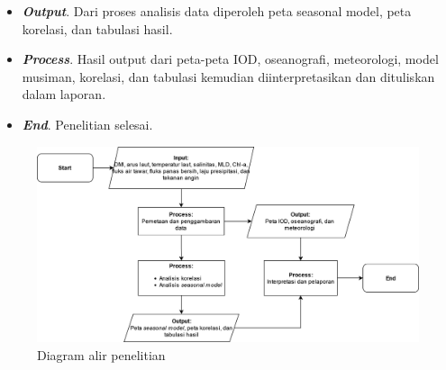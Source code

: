\begin{spacing}{1.5}
\begin{itemize}
		\item \textbf{\textit{Output}}. Dari proses analisis data diperoleh peta seasonal model, peta korelasi, dan tabulasi hasil.
		\item \textbf{\textit{Process}}. Hasil output dari peta-peta IOD, oseanografi, meteorologi, model musiman, korelasi, dan tabulasi kemudian diinterpretasikan dan dituliskan dalam laporan.
		\item \textbf{\textit{End}}. Penelitian selesai.
	\end{itemize}
	\begin{figure}[H]
		\centering
		\includegraphics[width=14cm]{contents/Figures/Flowchart_Diagram.png}
		\caption{Diagram alir penelitian}
		\label{fig:flowchart}
	\end{figure}
\end{spacing}
